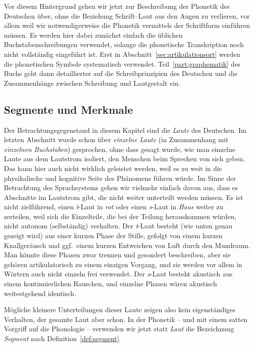 Vor diesem Hintergrund gehen wir jetzt zur Beschreibung der Phonetik des Deutschen über, ohne die Beziehung Schrift--Laut aus den Augen zu verlieren, vor allem weil wir notwendigerweise die Phonetik vermittels der Schriftform einführen müssen.
Es werden hier dabei zunächst einfach die üblichen Buchstabenschreibungen verwendet, solange die phonetische Transkription noch nicht vollständig eingeführt ist.
Erst in Abschnitt~\ref{sec:artikulationsort} werden die phonetischen Symbole systematisch verwendet.
Teil~\ref{part:graphematik} des Buchs geht dann detaillierter auf die Schreibprinzipien des Deutschen und die Zusammenhänge zwischen Schreibung und Lautgestalt ein.

\subsection{Segmente und Merkmale}
\label{sec:segmenteundmerkmale}

Der Betrachtungsgegenstand in diesem Kapitel sind die \textit{Laute} des Deutschen.
Im letzten Abschnitt wurde schon über \textit{einzelne Laute} (in Zusammenhang mit \textit{einzelnen Buchstaben}) gesprochen, ohne dass gesagt wurde, wie man einzelne Laute aus dem Lautstrom isoliert, den Menschen beim Sprechen von sich geben.
Das kann hier auch nicht wirklich geleistet werden, weil es zu weit in die physikalische und kognitive Seite des Phänomens führen würde.
Im Sinne der Betrachtung des Sprachsystems gehen wir vielmehr einfach davon aus, dass es Abschnitte im Lautstrom gibt, die nicht weiter unterteilt werden müssen.
Es ist \zB nicht zielführend, einen \textit{t}-Laut in \textit{rot} oder einen \textit{s}-Laut in \textit{Haus} weiter zu zerteilen, weil sich die Einzelteile, die bei der Teilung herauskommen würden, nicht autonom (selbständig) verhalten.
Der \textit{t}-Laut besteht (wie unten genau gezeigt wird) aus einer kurzen Phase der Stille, gefolgt von einem kurzen Knallgeräusch und ggf.\ einem kurzen Entweichen von Luft durch den Mundraum.
Man könnte diese Phasen zwar trennen und gesondert beschreiben, aber sie gehören artikulatorisch zu einem einzigen Vorgang, und sie werden vor allem in Wörtern auch nicht einzeln frei verwendet.
Der \textit{s}-Laut besteht akustisch aus einem kontinuierlichen Rauschen, und einzelne Phasen wären akustisch weitestgehend identisch.

Mögliche kleinere Unterteilungen dieser Laute zeigen also kein eigenständiges Verhalten, der gesamte Laut aber schon.
In der Phonetik -- und mit einem satten Vorgriff auf die Phonologie -- verwenden wir jetzt statt \textit{Laut} die Bezeichnung \textit{Segment} nach Definition~\ref{def:segment}.

